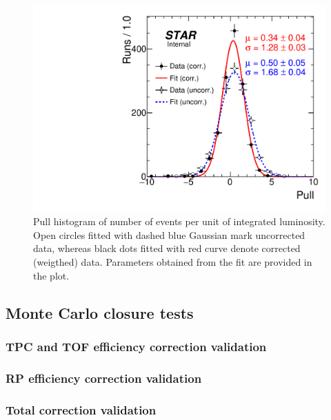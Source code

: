 \begin{figure}[ht!]
\centering%
\parbox{0.4725\textwidth}{%
  \centering%
  \includegraphics[width=\linewidth]{graphics/corrections/PullC.pdf}
}%
\quad%
\parbox{0.4725\textwidth}{%
    \caption[Pull histogram of number of events per unit of integrated luminosity.]{Pull histogram of number of events per unit of integrated luminosity. Open circles fitted with dashed blue Gaussian mark uncorrected data, whereas black dots fitted with red curve denote corrected (weigthed) data. Parameters obtained from the fit are provided in the plot.}\label{fig:pull}%
}
\end{figure}

\subsection{Monte Carlo closure tests}
\subsubsection{TPC and TOF efficiency correction validation}
\subsubsection{RP efficiency correction validation}
\subsubsection{Total correction validation}


